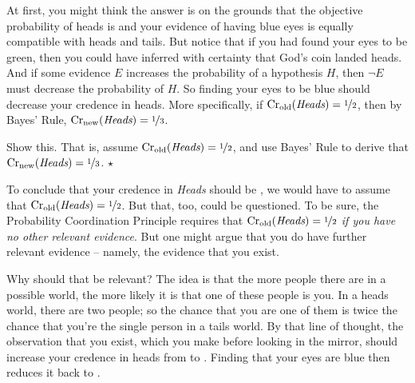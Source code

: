 At first, you might think the answer is  on the grounds
that the objective probability of heads is  and your
evidence of having blue eyes is equally compatible with heads and
tails. But notice that if you had found your eyes to be green, then
you could have inferred with certainty that God's coin landed
heads. And if some evidence $E$ increases the probability of a
hypothesis $H$, then $\neg E$ must decrease the probability of $H$. So
finding your eyes to be blue should decrease your credence in heads.
More specifically, if $\text{Cr}_\text{old}(\emph{Heads}) =
\nicefrac{1}{2}$, then by Bayes' Rule, $\text{Cr}_\text{new}(\emph{Heads}) =
\nicefrac{1}{3}$.

% 

\begin{exercise}
  Show this. That is, assume $\text{Cr}_\text{old}(\emph{Heads}) =
  \nicefrac{1}{2}$, and use Bayes' Rule to derive that $\text{Cr}_\text{new}(\emph{Heads}) =
  \nicefrac{1}{3}$. $\star$%
\end{exercise}

To conclude that your credence in \emph{Heads}
should be , we would have to assume that
$\text{Cr}_\text{old}(\emph{Heads}) = \nicefrac{1}{2}$. But that, too, could
be questioned. To be sure, the Probability Coordination Principle
requires that $\text{Cr}_\text{old}(\emph{Heads}) = \nicefrac{1}{2}$
\emph{if you have no other relevant evidence}. But one might argue
that you do have further relevant evidence -- namely, the evidence
that you exist.

Why should that be relevant? The idea is that the more people there
are in a possible world, the more likely it is that one of these
people is you. In a heads world, there are two people; so the chance
that you are one of them is twice the chance that you're the single
person in a tails world. By that line of thought, the observation that
you exist, which you make before looking in the mirror, should
increase your credence in heads from  to
. Finding that your eyes are blue then reduces it back to
.


